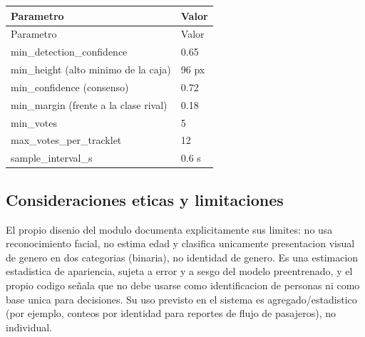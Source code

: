 \documentclass[12pt,letterpaper]{article}
\begin{document}
\begingroup\small\setlength{\tabcolsep}{4pt}\renewcommand{\arraystretch}{1.2}

\begin{longtable}{P{0.34\textwidth}P{0.6\textwidth}}
\toprule

Parametro & Valor \\

\midrule
\endfirsthead
\toprule
Parametro & Valor \\
\midrule
\endhead

min\_\allowbreak detection\_\allowbreak confidence & 0.65 \\

min\_\allowbreak height (alto minimo de la caja) & 96 px \\

min\_\allowbreak confidence (consenso) & 0.72 \\

min\_\allowbreak margin (frente a la clase rival) & 0.18 \\

min\_\allowbreak votes & 5 \\

max\_\allowbreak votes\_\allowbreak per\_\allowbreak tracklet & 12 \\

sample\_\allowbreak interval\_\allowbreak s & 0.6 s \\

\bottomrule
\end{longtable}
\endgroup

\subsection{Consideraciones eticas y limitaciones}

El propio disenio del modulo documenta explicitamente sus limites: no usa reconocimiento facial, no estima edad y clasifica unicamente presentacion visual de genero en dos categorias (binaria), no identidad de genero. Es una estimacion estadistica de apariencia, sujeta a error y a sesgo del modelo preentrenado, y el propio codigo señala que no debe usarse como identificacion de personas ni como base unica para decisiones. Su uso previsto en el sistema es agregado/estadistico (por ejemplo, conteos por identidad para reportes de flujo de pasajeros), no individual.
\end{document}
